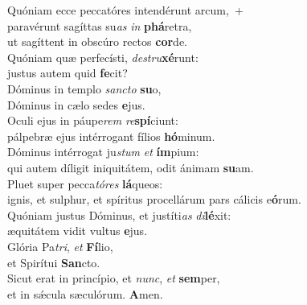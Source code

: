 \evenverse Quóniam ecce peccatóres intendérunt arcum,~+\\\evenverse  paravérunt sagíttas su\textit{as} \textit{in} \textbf{phá}retra,~\*\\
\evenverse ut sagíttent in obscúro rectos \textbf{cor}de.\\
\oddverse Quóniam quæ perfecísti, \textit{de}\textit{stru}\textbf{xé}runt:~\*\\
\oddverse justus autem quid \textbf{fe}cit?\\
\evenverse Dóminus in templo \textit{san}\textit{cto} \textbf{su}o,~\*\\
\evenverse Dóminus in cælo sedes \textbf{e}jus.\\
\oddverse Oculi ejus in páupe\textit{rem} \textit{re}\textbf{spí}ciunt:~\*\\
\oddverse pálpebræ ejus intérrogant fílios \textbf{hó}minum.\\
\evenverse Dóminus intérrogat ju\textit{stum} \textit{et} \textbf{ím}pium:~\*\\
\evenverse qui autem díligit iniquitátem, odit ánimam \textbf{su}am.\\
\oddverse Pluet super pecca\textit{tó}\textit{res} \textbf{lá}queos:~\*\\
\oddverse ignis, et sulphur, et spíritus procellárum pars cálicis e\textbf{ó}rum.\\
\evenverse Quóniam justus Dóminus, et justíti\textit{as} \textit{di}\textbf{lé}xit:~\*\\
\evenverse æquitátem vidit vultus \textbf{e}jus.\\
\oddverse Glória Pa\textit{tri}, \textit{et} \textbf{Fí}lio,~\*\\
\oddverse et Spirítui \textbf{San}cto.\\
\evenverse Sicut erat in princípio, et \textit{nunc}, \textit{et} \textbf{sem}per,~\*\\
\evenverse et in sǽcula sæculórum. \textbf{A}men.\\

